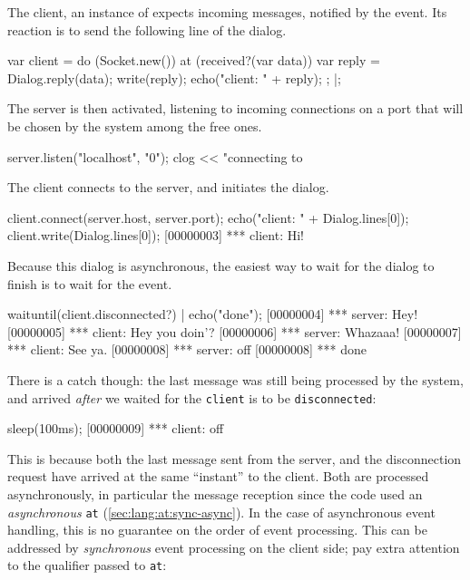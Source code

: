 The client, an instance of  expects incoming messages,
notified by the  event.  Its reaction is to send the
following line of the dialog.

\begin{urbiscript}
var client =
  do (Socket.new())
  {
    at (received?(var data))
    {
      var reply = Dialog.reply(data);
      write(reply);
      echo("client: " + reply);
    };
  }|;
\end{urbiscript}

The server is then activated, listening to incoming connections on a port
that will be chosen by the system among the free ones.

\begin{urbiscript}
server.listen("localhost", "0");
clog << "connecting to %
\end{urbiscript}

The client connects to the server, and initiates the dialog.

\begin{urbiscript}
client.connect(server.host, server.port);
echo("client: " + Dialog.lines[0]);
client.write(Dialog.lines[0]);
[00000003] *** client: Hi!
\end{urbiscript}

Because this dialog is asynchronous, the easiest way to wait for the dialog
to finish is to wait for the  event.

\begin{urbiscript}
waituntil(client.disconnected?) | echo("done");
[00000004] *** server: Hey!
[00000005] *** client: Hey you doin'?
[00000006] *** server: Whazaaa!
[00000007] *** client: See ya.
[00000008] *** server: off
[00000008] *** done
\end{urbiscript}

There is a catch though: the last message was still being processed by the
system, and arrived \emph{after} we waited for the \lstinline{client} is to
be \lstinline{disconnected}:

\begin{urbiscript}
sleep(100ms);
[00000009] *** client: off
\end{urbiscript}

This is because both the last message sent from the server, and the
disconnection request have arrived at the same ``instant'' to the client.
Both are processed asynchronously, in particular the message reception since
the code used an \emph{asynchronous} \lstinline{at}
(\autoref{sec:lang:at:sync-async}).  In the case of asynchronous event
handling, this is no guarantee on the order of event processing.  This can
be addressed by \emph{synchronous} event processing on the client side; pay
extra attention to the  qualifier passed to \lstinline{at}:

